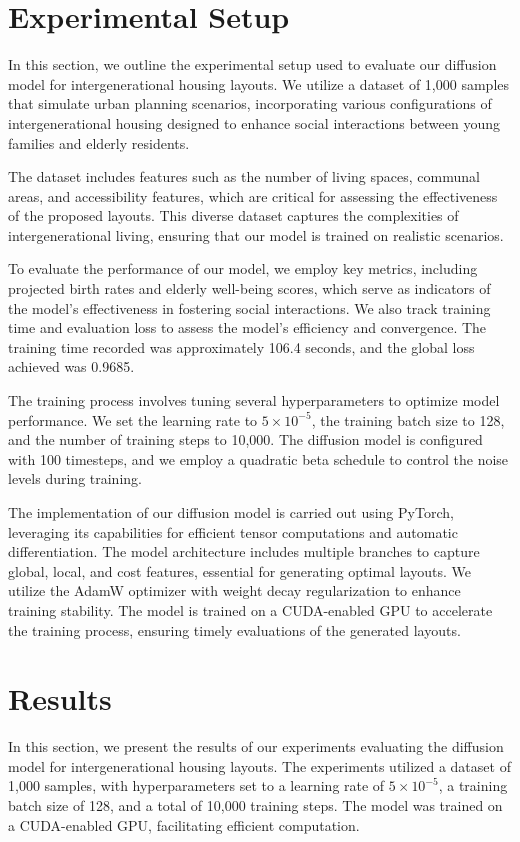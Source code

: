 \documentclass{article} %
\begin{document}
\section{Experimental Setup}
\label{sec:experimental}
In this section, we outline the experimental setup used to evaluate our diffusion model for intergenerational housing layouts. We utilize a dataset of 1,000 samples that simulate urban planning scenarios, incorporating various configurations of intergenerational housing designed to enhance social interactions between young families and elderly residents.

The dataset includes features such as the number of living spaces, communal areas, and accessibility features, which are critical for assessing the effectiveness of the proposed layouts. This diverse dataset captures the complexities of intergenerational living, ensuring that our model is trained on realistic scenarios.

To evaluate the performance of our model, we employ key metrics, including projected birth rates and elderly well-being scores, which serve as indicators of the model's effectiveness in fostering social interactions. We also track training time and evaluation loss to assess the model's efficiency and convergence. The training time recorded was approximately 106.4 seconds, and the global loss achieved was 0.9685.

The training process involves tuning several hyperparameters to optimize model performance. We set the learning rate to \(5 \times 10^{-5}\), the training batch size to 128, and the number of training steps to 10,000. The diffusion model is configured with 100 timesteps, and we employ a quadratic beta schedule to control the noise levels during training.

The implementation of our diffusion model is carried out using PyTorch, leveraging its capabilities for efficient tensor computations and automatic differentiation. The model architecture includes multiple branches to capture global, local, and cost features, essential for generating optimal layouts. We utilize the AdamW optimizer with weight decay regularization to enhance training stability. The model is trained on a CUDA-enabled GPU to accelerate the training process, ensuring timely evaluations of the generated layouts.

\section{Results}
\label{sec:results}
In this section, we present the results of our experiments evaluating the diffusion model for intergenerational housing layouts. The experiments utilized a dataset of 1,000 samples, with hyperparameters set to a learning rate of \(5 \times 10^{-5}\), a training batch size of 128, and a total of 10,000 training steps. The model was trained on a CUDA-enabled GPU, facilitating efficient computation.
\end{document}
